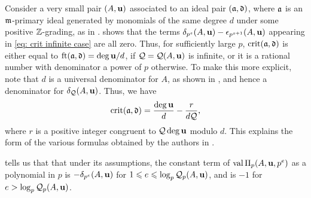 \documentclass{amsart}
\begin{document}
\begin{remark}
   Consider a very small pair $(A,\mathbf{u})$ associated to an ideal pair $(\mathfrak{a},\mathfrak{d})$, where $\mathfrak{a}$ is an $\mathfrak{m}$-primary ideal generated by monomials of the same degree $d$ under some positive $\mathbb{Z}$-grading, as in .
    shows that the terms $\delta_{p^s}(A,\mathbf{u})-\epsilon_{p^{s+1}}(A,\mathbf{u})$ appearing in \eqref{eq: crit infinite case} are all zero.
   Thus, for sufficiently large $p$, $\operatorname{crit}(\mathfrak{a},\mathfrak{d})$ is either equal to $\operatorname{ft}(\mathfrak{a}, \mathfrak{d}) = \deg \mathbf{u}/d$, if $\mathcal{Q}=\mathcal{Q}(A,\mathbf{u})$ is infinite, or it is a rational number with denominator a power of $p$ otherwise.
   To make this more explicit, note that $d$ is a universal denominator for $A$, as shown in , and hence a denominator for $\delta_{\mathcal{Q}}(A,\mathbf{u})$.
   Thus, we have
   \[\operatorname{crit}(\mathfrak{a},\mathfrak{d}) = \frac{\deg \mathbf{u}}{d} - \frac{r}{d\mathcal{Q}},\]
   where $r$ is a positive integer congruent to $\mathcal{Q}\deg\mathbf{u}$ modulo $d$.
   This explains the form of the various formulas obtained by the authors in \cite[Theorems~3.6, 4.8, and~5.5]{hernandez+etal.frobenius_examples}.
\end{remark}


\begin{remark}
 tells us that that under its assumptions, the constant term of $\operatorname{val} \Pi_p(A,\mathbf{u},p^e)$ as a polynomial in $p$ is $- \delta_{p^e}(A,\mathbf{u})$ for
  $1 \leqslant e \leqslant \log_p \mathcal{Q}_p(A,\mathbf{u})$, and is $-1$ for $e > \log_p \mathcal{Q}_p(A,\mathbf{u})$.
\end{remark}
\end{document}
